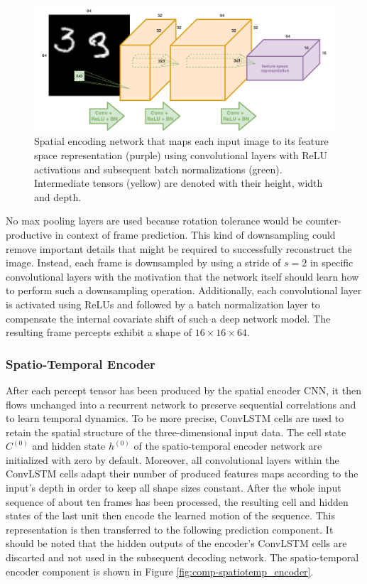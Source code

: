 \begin{figure}[htb]
	\centering
	\includegraphics[width=0.9\linewidth]{figures/comp_spatial_encoder.pdf} 
	\caption[Spatial Encoder Component]{Spatial encoding network that maps each input image to its feature space representation (purple) using convolutional layers with ReLU activations and subsequent batch normalizations (green). Intermediate tensors (yellow) are denoted with their height, width and depth.} \label{fig:comp-spatial_encoder}
\end{figure}

No max pooling layers are used because rotation tolerance would be counter-productive in context of frame prediction. This kind of downsampling could remove important details that might be required to successfully reconstruct the image. Instead, each frame is downsampled by using a stride of $ s=2 $ in specific convolutional layers with the motivation that the network itself should learn how to perform such a downsampling operation. Additionally, each convolutional layer is activated using ReLUs and followed by a batch normalization layer to compensate the internal covariate shift of such a deep network model. The resulting frame percepts exhibit a shape of $16\times16\times64$.

\subsubsection{Spatio-Temporal Encoder}



After each percept tensor has been produced by the spatial encoder CNN, it then flows unchanged into a recurrent network to preserve sequential correlations and to learn temporal dynamics. To be more precise, ConvLSTM cells are used to retain the spatial structure of the three-dimensional input data. The cell state $C^{(0)}$ and hidden state $h^{(0)}$ of the spatio-temporal encoder network are initialized with zero by default. Moreover, all convolutional layers within the ConvLSTM cells adapt their number of produced features maps according to the input's depth in order to keep all shape sizes constant. After the whole input sequence of about ten frames has been processed, the resulting cell and hidden states of the last unit then encode the learned motion of the sequence. This representation is then transferred to the following prediction component. It should be noted that the hidden outputs of the encoder's ConvLSTM cells are discarted and not used in the subsequent decoding network. The spatio-temporal encoder component is shown in Figure \ref{fig:comp-spatiotemp_encoder}.

